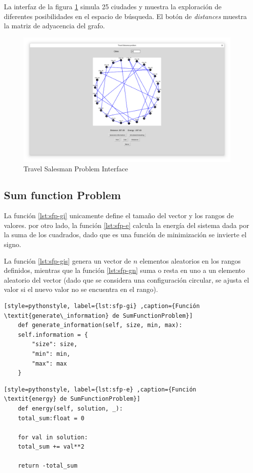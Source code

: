 La interfaz de la figura \ref{fig:tsp} simula 25 ciudades y muestra la exploración de diferentes posibilidades en el espacio de búsqueda. El botón de \textit{distances} muestra la matriz de adyacencia del grafo.

\begin{figure}[h!]
	\centering
	\includegraphics[width=\linewidth]{img/tsp}
	\caption{Travel Salesman Problem Interface}
	\label{fig:tsp}
\end{figure}

\subsection{Sum function Problem}

La función \ref{lst:sfp-gi} unicamente define el tamaño del vector y los rangos de valores. por otro lado, la función \ref{lst:sfp-e} calcula la energía del sistema dada por la suma de los cuadrados, dado que es una función de minimización se invierte el signo.

La función \ref{lst:sfp-gis} genera un vector de $n$ elementos aleatorios en los rangos definidos, mientras que la función \ref{lst:sfp-gn} suma  o resta en uno a un elemento aleatorio del vector (dado que se considera una configuración circular, se ajusta el valor si el nuevo valor no se encuentra en el rango).

\begin{lstlisting}[style=pythonstyle, label={lst:sfp-gi} ,caption={Función \textit{generate\_information} de SumFunctionProblem}]
	def generate_information(self, size, min, max):
	self.information = {
		"size": size,
		"min": min,
		"max": max
	}
\end{lstlisting}

\begin{lstlisting}[style=pythonstyle, label={lst:sfp-e} ,caption={Función \textit{energy} de SumFunctionProblem}]
	def energy(self, solution, _):
	total_sum:float = 0
	
	for val in solution:
	total_sum += val**2
	
	return -total_sum
\end{lstlisting}

